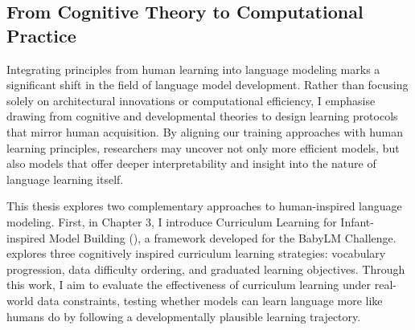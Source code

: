 



\subsection*{From Cognitive Theory to Computational Practice}

Integrating principles from human learning into language modeling marks a significant shift in the field of language model development. Rather than focusing solely on architectural innovations or computational efficiency, I emphasise drawing from cognitive and developmental theories to design learning protocols that mirror human acquisition. By aligning our training approaches with human learning principles, researchers may uncover not only more efficient models, but also models that offer deeper interpretability and insight into the nature of language learning itself.

This thesis explores two complementary approaches to human-inspired language modeling. First, in Chapter 3, I introduce Curriculum Learning for Infant-inspired Model Building (\climb), a framework developed for the BabyLM Challenge. \climb explores three cognitively inspired curriculum learning strategies: vocabulary progression, data difficulty ordering, and graduated learning objectives. Through this work, I aim to evaluate the effectiveness of curriculum learning under real-world data constraints, testing whether models can learn language more like humans do by following a developmentally plausible learning trajectory.

